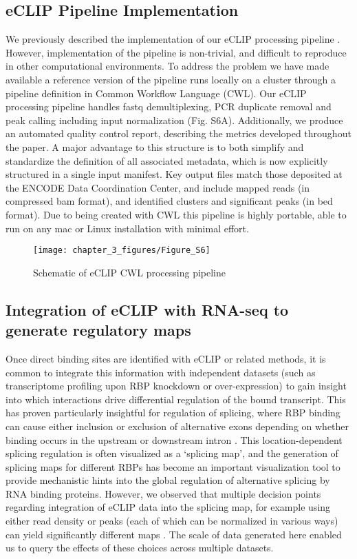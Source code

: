 \subsection{eCLIP Pipeline Implementation}
We previously described the implementation of our eCLIP processing pipeline \cite{VanNostrand2016}. However, implementation of the pipeline is non-trivial, and difficult to reproduce in other computational environments. To address the problem we have made available a reference version of the pipeline runs locally on a cluster through a pipeline definition in Common Workflow Language (CWL). Our eCLIP processing pipeline handles fastq demultiplexing, PCR duplicate removal and peak calling including input normalization (Fig. S6A). Additionally, we produce an automated quality control report, describing the metrics developed throughout the paper. A major advantage to this structure is to both simplify and standardize the definition of all associated metadata, which is now explicitly structured in a single input manifest. Key output files match those deposited at the ENCODE Data Coordination Center, and include mapped reads (in compressed bam format), and identified clusters and significant peaks (in bed format). Due to being created with CWL this pipeline is highly portable, able to run on any mac or Linux installation with minimal effort. 

\begin{figure}[ht]
  \centering
  \texttt{[image: chapter\_3\_figures/Figure\_S6]}
  \caption[Supplementary Figure 5. CWL Pipeline Design]{Schematic of eCLIP CWL processing pipeline}
  \label{fig:Figure_S6}
\end{figure}

\subsection{Integration of eCLIP with RNA-seq to generate regulatory maps}
Once direct binding sites are identified with eCLIP or related methods, it is common to integrate this information with independent datasets (such as transcriptome profiling upon RBP knockdown or over-expression) to gain insight into which interactions drive differential regulation of the bound transcript. This has proven particularly insightful for regulation of splicing, where RBP binding can cause either inclusion or exclusion of alternative exons depending on whether binding occurs in the upstream or downstream intron \cite{Yeo2009}. This location-dependent splicing regulation is often visualized as a ‘splicing map’, and the generation of splicing maps for different RBPs has become an important visualization tool to provide mechanistic hints into the global regulation of alternative splicing by RNA binding proteins. However, we observed that multiple decision points regarding integration of eCLIP data into the splicing map, for example using either read density or peaks (each of which can be normalized in various ways) can yield significantly different maps \cite{Witten2011,Huelga2012}. The scale of data generated here enabled us to query the effects of these choices across multiple datasets.

